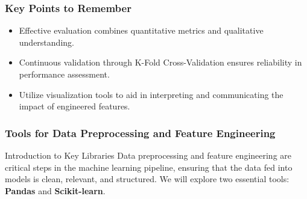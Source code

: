 \documentclass[aspectratio=169]{beamer}
\begin{document}
\begin{frame}[fragile]
    \frametitle{Key Points to Remember}
    
    \begin{itemize}
        \item Effective evaluation combines quantitative metrics and qualitative understanding.
        \item Continuous validation through K-Fold Cross-Validation ensures reliability in performance assessment.
        \item Utilize visualization tools to aid in interpreting and communicating the impact of engineered features.
    \end{itemize}
\end{frame}

\begin{frame}
    \frametitle{Tools for Data Preprocessing and Feature Engineering}
    \begin{block}{Introduction to Key Libraries}
        Data preprocessing and feature engineering are critical steps in the machine learning pipeline, ensuring that the data fed into models is clean, relevant, and structured. We will explore two essential tools: \textbf{Pandas} and \textbf{Scikit-learn}.
    \end{block}
\end{frame}
\end{document}
